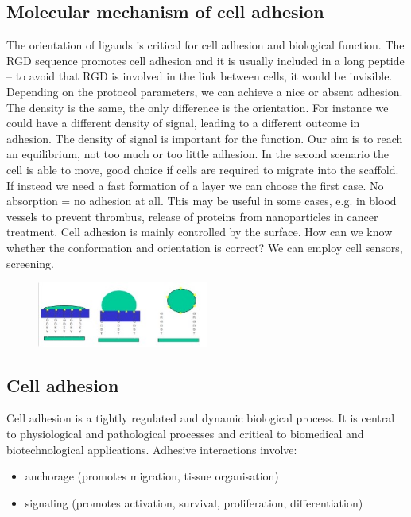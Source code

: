 \subsection{Molecular mechanism of cell adhesion}
The orientation of ligands is critical for cell adhesion and biological function. The RGD sequence promotes cell adhesion and it is usually included in a long peptide – to avoid that RGD is involved in the link between cells, it would be invisible. Depending on the protocol parameters, we can achieve a nice or absent adhesion. The density is the same, the only difference is the orientation.
For instance we could have a different density of signal,  leading to a different outcome in adhesion. The density of signal is important for the function.  Our aim is to reach an equilibrium, not too much or too little adhesion. In the second scenario the cell is able to move, good choice if cells are required to migrate into the scaffold. If instead we need a fast formation of a layer we can choose the first case.
No absorption = no adhesion at all. This may be useful in some cases, e.g. in blood vessels to prevent thrombus, release of proteins from nanoparticles in cancer treatment. 
Cell adhesion is mainly controlled by the surface. How can we know whether the conformation and orientation is correct? We can employ cell sensors, screening.

\begin{figure}[h]
\includegraphics[width=0.5\textwidth, center]{adhesion}
\caption{\label{fig:adhesion}}
\end{figure}

\subsection{Cell adhesion}
Cell adhesion is a tightly regulated and dynamic biological process. It is central to physiological and pathological processes and critical to biomedical and biotechnological applications.
Adhesive interactions involve:
\begin{itemize}
\item anchorage (promotes migration, tissue organisation)
\item signaling (promotes activation, survival, proliferation, differentiation) 
\end{itemize}


